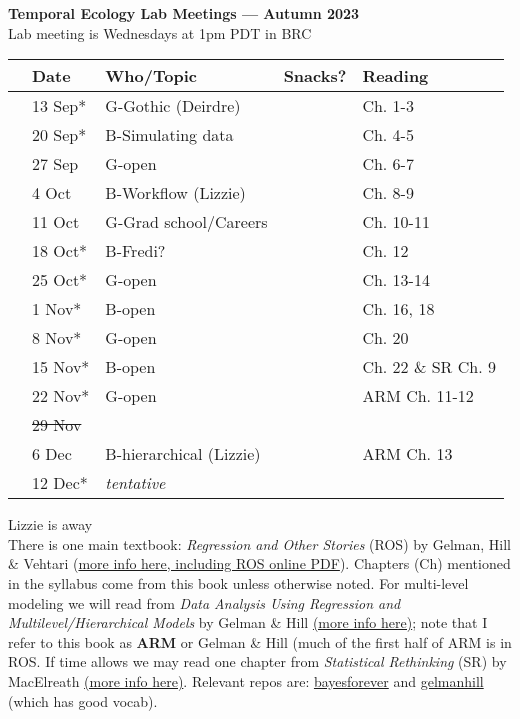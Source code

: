 \documentclass[11pt]{article}
\begin{document}
 
\raggedright
{}

\begin{center} 
{\large \textbf{Temporal Ecology Lab Meetings --- Autumn 2023}} \\ [2pt]
Lab meeting is Wednesdays at 1pm PDT in BRC\\ %
\end{center} 

\begin{center}
\begin{tabular}{ p{0.2 cm}  p{2 cm}  p{4.5 cm}  p{3 cm}  p{3.5 cm} }  \hline \hline
 & \textbf{Date}
   & \textbf{Who/Topic}
      & \textbf{Snacks?} 
         & \textbf{Reading} \\ 
\hline \hline
 &13 Sep* & G-Gothic (Deirdre)  &       & Ch. 1-3 \\\hline
 & 20 Sep* & B-Simulating data & & Ch. 4-5 \\\hline
 & 27 Sep & G-open &  & Ch. 6-7 \\\hline  
 & 4 Oct &  B-Workflow (Lizzie)   &  &  Ch. 8-9 \\\hline
 & 11 Oct  & G-Grad school/Careers  & &  Ch. 10-11 \\\hline 
 & 18 Oct* & B-Fredi? & & Ch. 12  \\\hline
 & 25 Oct*  & G-open &  & Ch. 13-14\\\hline
 & 1 Nov* &  B-open  & & Ch. 16, 18  \\\hline 
  & 8 Nov*  &  G-open  &  &  Ch. 20 \\\hline
 & 15 Nov*  &  B-open  &  &  Ch. 22 \& SR Ch. 9 \\\hline
  & 22 Nov*  &  G-open  &  & ARM Ch. 11-12 \\\hline
 & \sout{29 Nov}  &    &  &  \\\hline
 & 6 Dec  & B-hierarchical (Lizzie)    &  & ARM Ch. 13 \\\hline
 & 12 Dec*  &  \emph{tentative}    &  & \\\hline
\hline
\end{tabular}
\end{center}
\noindent *Lizzie is away \\
There is one main textbook: \emph{Regression and Other Stories} (ROS) by Gelman, Hill \& Vehtari (\href{https://avehtari.github.io/ROS-Examples/}{more info here, including ROS online PDF}). Chapters (Ch) mentioned in the syllabus come from this book unless otherwise noted. For multi-level modeling we will read from \emph{Data Analysis Using Regression and Multilevel/Hierarchical Models} by Gelman \& Hill \href{http://www.stat.columbia.edu/~gelman/arm/}{(more info here)}; note that I refer to this book as {\bf ARM} or Gelman \& Hill (much of the first half of ARM is in ROS. If time allows we may read one chapter from \emph{Statistical Rethinking} (SR) by MacElreath \href{http://xcelab.net/rm/statistical-rethinking/}{(more info here)}. Relevant repos are: \href{https://github.com/temporalecologylab/bayesforever}{bayesforever} and \href{https://github.com/lizzieinvancouver/gelmanhill}{gelmanhill} (which has good vocab). \\
\end{document}
